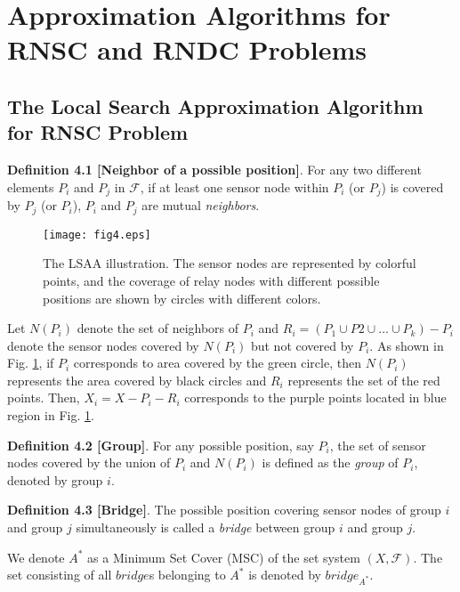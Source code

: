 \documentclass[journal]{IEEEtran}
\begin{document}
\section{Approximation Algorithms for RNSC and RNDC Problems}
\subsection{The Local Search Approximation Algorithm for RNSC Problem}
\textbf{Definition 4.1 [Neighbor of a possible position]}. For any two different elements $P_i$ and $P_j$ in $\mathcal{F}$, if at least one sensor node within $P_i$ (or $P_j$) is covered by $P_j$ (or $P_i$), $P_i$ and $P_j$ are mutual \emph{neighbors}.

\begin{figure}
\begin{center}
\texttt{[image: fig4.eps]}    \caption{The LSAA illustration. The sensor nodes are represented by colorful points, and the coverage of relay nodes with different possible
positions are shown by circles with different colors.}
\label{fig4}                                 \end{center}                                 \end{figure}

Let $N(P_i)$ denote the set of neighbors of $P_i$ and $R_i=(P_1\cup P2\cup \ldots \cup P_k)-P_i$ denote the sensor nodes covered by $N(P_i)$ but not covered by $P_i$. As shown in Fig. \ref{fig4}, if $P_i$ corresponds to area covered by the green circle, then $N(P_i)$ represents the area covered by black circles and $R_i$ represents the set of the red points. Then, $X_i=X-P_i-R_i$ corresponds to the purple points located in blue region in Fig. \ref{fig4}.

\textbf{Definition 4.2 [Group]}. For any possible position, say $P_{i}$, the set of sensor nodes covered by the union of $P_{i}$ and $N(P_i)$ is defined as the \emph{group} of $P_{i}$, denoted by group $i$.

\textbf{Definition 4.3 [Bridge]}. The possible position covering sensor nodes of group $i$ and group $j$ simultaneously is called a \emph{bridge} between group $i$ and group $j$.

We denote $A^*$ as a Minimum Set Cover (MSC) of the set system $(X, \mathcal{F})$. The set consisting of all $bridge$s belonging to $A^*$ is denoted by $bridge_{A^*}$.
\end{document}

